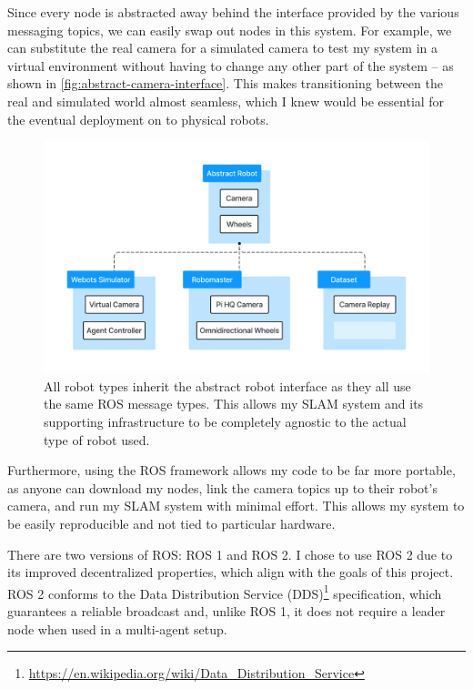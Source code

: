 
Since every node is abstracted away behind the interface provided by the various messaging topics, we can easily swap out nodes in this system. For example, we can substitute the real camera for a simulated camera to test my system in a virtual environment without having to change any other part of the system – as shown in \autoref{fig:abstract-camera-interface}. This makes transitioning between the real and simulated world almost seamless, which I knew would be essential for the eventual deployment on to physical robots.

\begin{figure}[h]
    \centering
    \includegraphics[trim=5cm 5cm 5cm 5cm, scale=0.15]{figures/abstract_camera_interface.pdf}

    \caption{All robot types inherit the abstract robot interface as they all use the same ROS message types. This allows my SLAM system and its supporting infrastructure to be completely agnostic to the actual type of robot used.}
    \label{fig:abstract-camera-interface}
\end{figure}

Furthermore, using the ROS framework allows my code to be far more portable, as anyone can download my nodes, link the camera topics up to their robot's camera, and run my SLAM system with minimal effort. This allows my system to be easily reproducible and not tied to particular hardware.

There are two versions of ROS: ROS 1 and ROS 2. I chose to use ROS 2 due to its improved decentralized properties, which align with the goals of this project. ROS 2 conforms to the Data Distribution Service (DDS)\footnote[1]{\url{https://en.wikipedia.org/wiki/Data_Distribution_Service}} specification, which guarantees a reliable broadcast and, unlike ROS 1, it does not require a leader node when used in a multi-agent setup.


